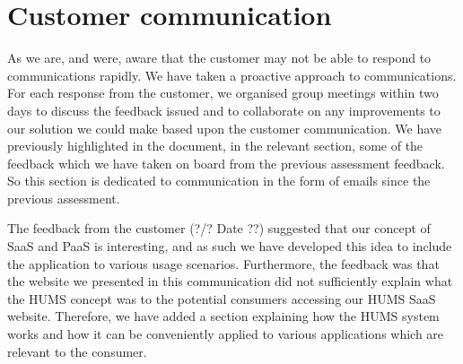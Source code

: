 \section{Customer communication}
\label{sec:communication}

As we are, and were, aware that the customer may not be able to
respond to communications rapidly. We have taken a proactive approach
to communications. For each response from the customer, we organised
group meetings within two days to discuss the feedback issued and to
collaborate on any improvements to our solution we could make based
upon the customer communication. We have previously highlighted in the
document, in the relevant section, some of the feedback which we have
taken on board from the previous assessment feedback. So this section
is dedicated to communication in the form of emails since the previous
assessment.

The feedback from the customer (?/? Date ??) suggested that our
concept of SaaS and PaaS is interesting, and as such we have developed
this idea to include the application to various usage
scenarios. Furthermore, the feedback was that the website we presented
in this communication did not sufficiently explain what the HUMS
concept was to the potential consumers accessing our HUMS SaaS
website. Therefore, we have added a section explaining how the HUMS
system works and how it can be conveniently applied to various
applications which are relevant to the consumer.

